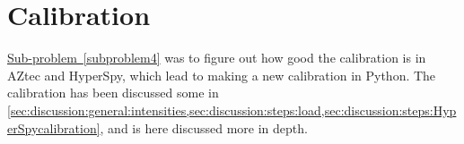 





















%
\section{Calibration}
\label{sec:discussion:calibration}



\hyperref[subproblem4]{Sub-problem~\ref*{subproblem4}} was to figure out how good the calibration is in AZtec and HyperSpy, which lead to making a new calibration in Python.
The calibration has been discussed some in \cref{sec:discussion:general:intensities,sec:discussion:steps:load,sec:discussion:steps:HyperSpycalibration}, and is here discussed more in depth.

